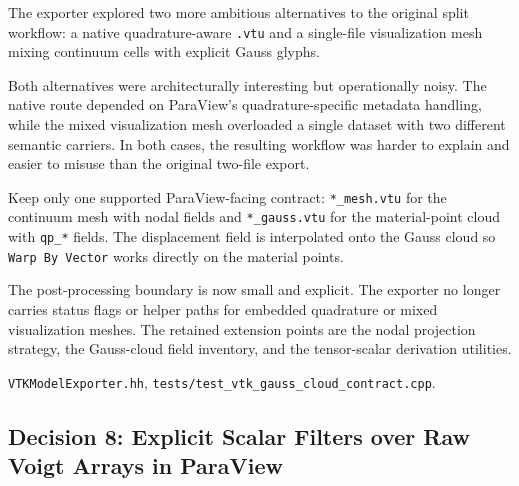 \begin{description}[leftmargin=0pt,style=nextline]
  \item[Context] The exporter explored two more ambitious alternatives to the
    original split workflow: a native quadrature-aware \texttt{.vtu} and a
    single-file visualization mesh mixing continuum cells with explicit Gauss
    glyphs.

  \item[Problem] Both alternatives were architecturally interesting but
    operationally noisy.  The native route depended on ParaView's
    quadrature-specific metadata handling, while the mixed visualization mesh
    overloaded a single dataset with two different semantic carriers.  In both
    cases, the resulting workflow was harder to explain and easier to misuse
    than the original two-file export.

  \item[Decision] Keep only one supported ParaView-facing contract:
    \texttt{*\_mesh.vtu} for the continuum mesh with nodal fields and
    \texttt{*\_gauss.vtu} for the material-point cloud with \texttt{qp\_*}
    fields.  The displacement field is interpolated onto the Gauss cloud so
    \texttt{Warp By Vector} works directly on the material points.

  \item[Architectural consequence] The post-processing boundary is now small
    and explicit.  The exporter no longer carries status flags or helper paths
    for embedded quadrature or mixed visualization meshes.  The retained
    extension points are the nodal projection strategy, the Gauss-cloud field
    inventory, and the tensor-scalar derivation utilities.

  \item[Source] \texttt{VTKModelExporter.hh},
    \texttt{tests/test\_vtk\_gauss\_cloud\_contract.cpp}.
\end{description}


\subsection{Decision 8: Explicit Scalar Filters over Raw Voigt Arrays in ParaView}
\label{sec:dec_vtk_tensor_filters}

